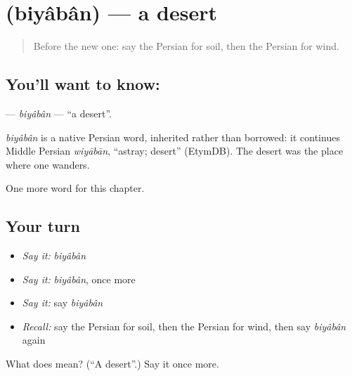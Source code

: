 \section[\texorpdfstring{\fa{بیابان} (biyâbân)}{بیابان (biyâbân)}]{ (biyâbân) — a desert}

\label{lesson:FA-C54-biyaban}



\begin{quote}
Before the new one: say the Persian for soil, then the Persian for wind.
\end{quote}

\subsection*{You'll want to know: }
\textbf{} — \emph{biyâbân} — \textquotedblleft{}a desert\textquotedblright{}.

\begin{cousinweb}
\emph{biyâbân} is a native Persian word, inherited rather than borrowed: it continues Middle Persian \emph{wiyābān}, \textquotedblleft{}astray; desert\textquotedblright{} (EtymDB). The desert was the place where one wanders.
\end{cousinweb}

\begin{grammarlens}[title={What you've built}]
One more word for this chapter.
\end{grammarlens}

\subsection*{Your turn}
\begin{itemize}
\raggedright
  \item \emph{Say it:} \emph{biyâbân}
  \item \emph{Say it:} \emph{biyâbân}, once more
  \item \emph{Say it:} say \emph{biyâbân}
  \item \emph{Recall:} say the Persian for soil, then the Persian for wind, then say \emph{biyâbân} again
\end{itemize}

\begin{tcolorbox}[breakable,colback=teal!4,colframe=teal!35!black,title={Before you move on}]
What does  mean? (\textquotedblleft{}A desert\textquotedblright{}.) Say it once more.
\end{tcolorbox}
